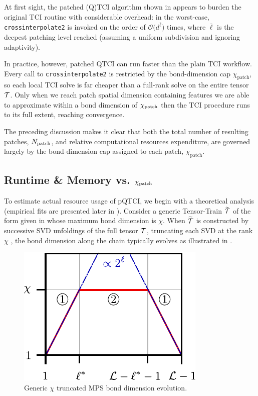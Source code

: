 At first sight, the patched (Q)TCI algorithm shown in  appears to burden the original TCI routine with considerable overhead: in the worst-case, \texttt{crossinterpolate2} is invoked on the order of $\mathcal{O}\bigl(d^{\bar\ell}\bigr)$ times, where $\bar\ell$ is the deepest patching level reached (assuming a uniform subdivision and ignoring adaptivity).

In practice, however, patched QTCI can run faster than the plain TCI workflow. Every call to \texttt{crossinterpolate2} is restricted by the bond-dimension cap $\chi_{\text{patch}}$, so each local TCI solve is far cheaper than a full-rank solve on the entire tensor $\mathcal{T}$. Only when we reach patch spatial dimension containing features we are able to approximate within a bond dimension of $\chi_{\text{patch}}$ then the TCI procedure runs to its full extent, reaching convergence. 

The preceding discussion makes it clear that both the total number of resulting patches, $N_{\text{patch}}$, and relative computational resources expenditure, are governed largely by the bond-dimension cap assigned to each patch, $\chi_{\text{patch}}$. 

\subsection{Runtime \& Memory vs. $\chi_{\text{patch}}$}

To estimate actual resource usage of pQTCI, we begin with a theoretical analysis (empirical fits are presented later in ). 
Consider a generic Tensor-Train $\widetilde{\mathcal{T}}$ of the form given in  whose maximum bond dimension is $\chi$. When $\widetilde{\mathcal{T}}$ is constructed by successive SVD unfoldings of the full tensor $\mathcal{T}$, truncating each SVD at the rank $\chi$ \cite{vonDelftTNNotes, Fannes1992, tensornetwork.org}, the bond dimension along the chain typically evolves  as illustrated in .

\begin{figure}[ht!]
	\centering
	\includegraphics{figures/TypicalBondDims.pdf}
	\caption{Generic $\chi$ truncated MPS bond dimension evolution.}
	\label{fig:typicalBondDim}
\end{figure}

